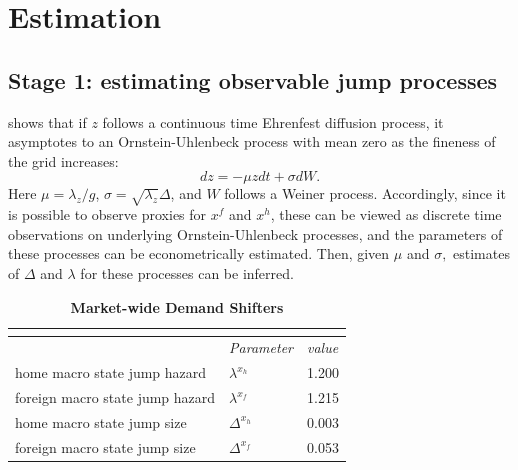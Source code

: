 \section{Estimation}

\subsection{Stage 1: estimating observable jump processes}

\citet{shimer2005cyclical} shows that if $z$ follows a continuous time Ehrenfest
diffusion process, it asymptotes to an Ornstein-Uhlenbeck process with mean
zero as the fineness of the grid increases:\footnotemark{} 
\begin{equation*}
dz=-\mu zdt+\sigma dW.
\end{equation*}%
Here $\mu =\lambda _{z}/g$, $\sigma =\sqrt{\lambda _{z}}\Delta $, and $W$
follows a Weiner process. Accordingly, since it is possible to observe
proxies for $x^{f}$ and $x^{h}$, these can be viewed as discrete time
observations on underlying Ornstein-Uhlenbeck processes, and the parameters
of these processes can be econometrically estimated. Then, given $\mu $ and $%
\sigma ,$ estimates of $\Delta $ and $\lambda $ for these processes can be
inferred.

\begin{table}
    \centering
    \begin{tabular}{lll}
        \multicolumn{3}{c}{\textbf{}} \\ 
        \hline\hline
        & \textit{Parameter} & \textit{value} \\ \hline
        home macro state jump hazard    & $\lambda ^{x_{h}}$ & \multicolumn{1}{c}{1.200}  \\
        foreign macro state jump hazard & $\lambda ^{x_{f}}$ & \multicolumn{1}{c}{ 1.215} \\
        home macro state jump size      & $\Delta ^{x_{h}}$  & \multicolumn{1}{c}{0.003}  \\
        foreign macro state jump size   & $\Delta ^{x_{f}}$  & \multicolumn{1}{c}{0.053}  \\ \hline
    \end{tabular}%
    \caption{\textbf{Market-wide Demand Shifters}}
    \label{tab:dem_shift}
\end{table}


